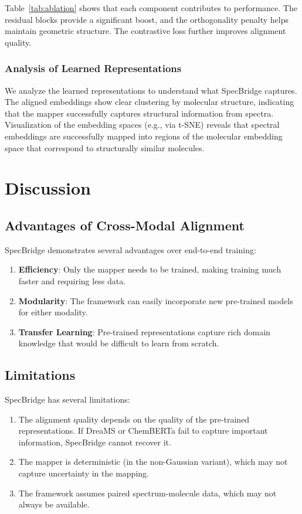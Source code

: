 \documentclass[11pt]{article}
\begin{document}
Table~\ref{tab:ablation} shows that each component contributes to performance. The residual blocks provide a significant boost, and the orthogonality penalty helps maintain geometric structure. The contrastive loss further improves alignment quality.

\subsubsection{Analysis of Learned Representations}

We analyze the learned representations to understand what SpecBridge captures. The aligned embeddings show clear clustering by molecular structure, indicating that the mapper successfully captures structural information from spectra. Visualization of the embedding spaces (e.g., via t-SNE) reveals that spectral embeddings are successfully mapped into regions of the molecular embedding space that correspond to structurally similar molecules.

\section{Discussion}

\subsection{Advantages of Cross-Modal Alignment}

SpecBridge demonstrates several advantages over end-to-end training:

\begin{enumerate}
    \item \textbf{Efficiency}: Only the mapper needs to be trained, making training much faster and requiring less data.
    \item \textbf{Modularity}: The framework can easily incorporate new pre-trained models for either modality.
    \item \textbf{Transfer Learning}: Pre-trained representations capture rich domain knowledge that would be difficult to learn from scratch.
\end{enumerate}

\subsection{Limitations}

SpecBridge has several limitations:

\begin{enumerate}
    \item The alignment quality depends on the quality of the pre-trained representations. If DreaMS or ChemBERTa fail to capture important information, SpecBridge cannot recover it.
    \item The mapper is deterministic (in the non-Gaussian variant), which may not capture uncertainty in the mapping.
    \item The framework assumes paired spectrum-molecule data, which may not always be available.
\end{enumerate}
\end{document}
